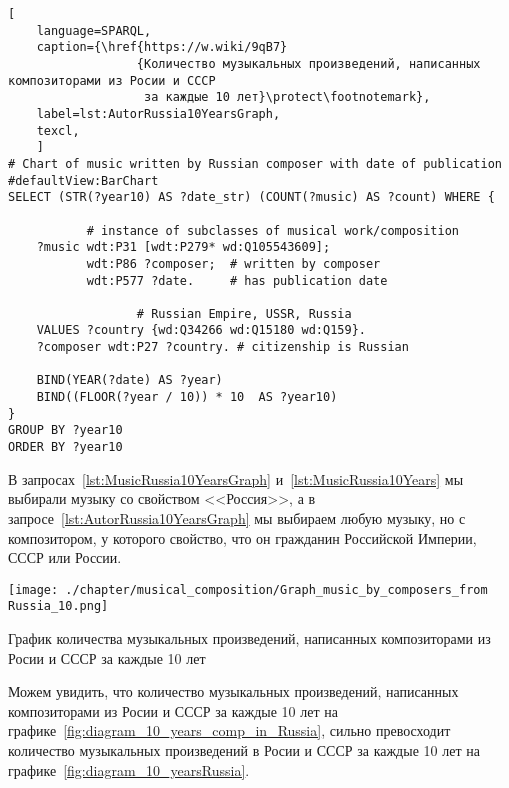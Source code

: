 \begin{lstlisting}[ 
    language=SPARQL,
    caption={\href{https://w.wiki/9qB7}
                  {Количество музыкальных произведений, написанных композиторами из Росии и СССР 
                   за каждые 10 лет}\protect\footnotemark},
    label=lst:AutorRussia10YearsGraph,
    texcl,
    ]
# Chart of music written by Russian composer with date of publication
#defaultView:BarChart
SELECT (STR(?year10) AS ?date_str) (COUNT(?music) AS ?count) WHERE {
    
           # instance of subclasses of musical work/composition
    ?music wdt:P31 [wdt:P279* wd:Q105543609];
           wdt:P86 ?composer;  # written by composer
           wdt:P577 ?date.     # has publication date
    
                  # Russian Empire, USSR, Russia
    VALUES ?country {wd:Q34266 wd:Q15180 wd:Q159}.
    ?composer wdt:P27 ?country. # citizenship is Russian
  
    BIND(YEAR(?date) AS ?year)
    BIND((FLOOR(?year / 10)) * 10  AS ?year10)
}
GROUP BY ?year10
ORDER BY ?year10
\end{lstlisting}%

В запросах~\ref{lst:MusicRussia10YearsGraph} и~\ref{lst:MusicRussia10Years} мы выбирали музыку со свойством <<Россия>>, 
а в запросе~\ref{lst:AutorRussia10YearsGraph} мы выбираем любую музыку, но с композитором, у которого свойство, 
что он гражданин Российской Империи, СССР или России.

\begin{marginfigure}[0\baselineskip]
	\texttt{[image: ./chapter/musical\_composition/Graph\_music\_by\_composers\_from Russia\_10.png]}
    \vspace{-7pt}
	\caption{График количества музыкальных произведений, написанных композиторами из Росии и СССР 
                   за каждые 10 лет}%
	\label{fig:diagram_10_yearsRussia}%

\end{marginfigure}

Можем увидить, что количество музыкальных произведений, написанных композиторами из Росии и СССР за каждые 10 лет 
на графике~\ref{fig:diagram_10_years_comp_in_Russia}, сильно превосходит количество музыкальных произведений в Росии и СССР за каждые 10 лет 
на графике~\ref{fig:diagram_10_yearsRussia}.

